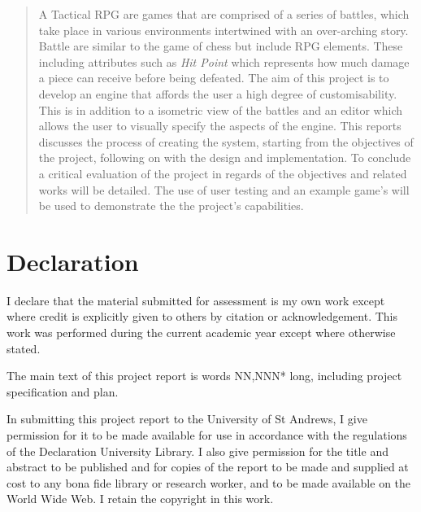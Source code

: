 
\begin{abstract}

A Tactical RPG are games that are comprised of a series of battles, which take place in various environments intertwined with an over-arching story. Battle are similar to the game of chess but include RPG elements. These including attributes such as \emph{Hit Point} which represents how much damage a piece can receive before being defeated.  The aim of this project is  to develop an engine that affords the user a high degree of customisability. This is in addition to a isometric view of the battles and an editor which allows the user to visually specify the aspects of the engine. This reports discusses the process of creating the system, starting from the objectives of the project, following on with the design and implementation.  To conclude a critical evaluation of the project in regards of the objectives and related works will be detailed. The use of user testing and an example game's will be used to demonstrate the the project's capabilities.

\end{abstract}

\sectionfont{
	\sectionrule{0pt}{0pt}{-10pt}{0.8pt}
}

\section*{Declaration}
I declare that the material submitted for assessment is my own work except where credit is explicitly given to others by citation or acknowledgement. This work was performed during the current academic year except where otherwise stated.

The main text of this project report is words NN,NNN* long, including project specification and plan. 

In submitting this project report to the University of St Andrews, I give permission for it to be made available for use in accordance with the regulations of the Declaration University Library. I also give permission for the title and abstract to be published and for copies of the report to be made and supplied at cost to any bona fide library or research worker, and to be made available on the World Wide Web. I retain the copyright in this work.